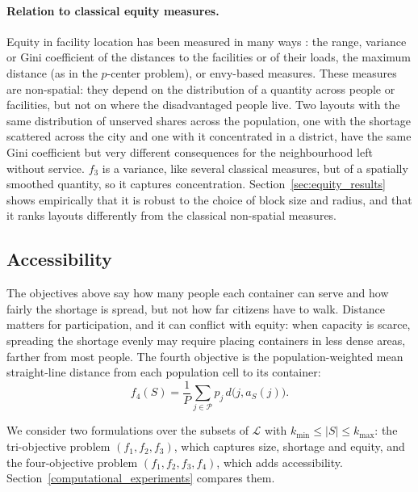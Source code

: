 \paragraph{Relation to classical equity measures.}
Equity in facility location has been measured in many ways \cite{marsh1994equity,barbati2016equality}: the range, variance or Gini coefficient of the distances to the facilities or of their loads, the maximum distance (as in the $p$-center problem), or envy-based measures. These measures are non-spatial: they depend on the distribution of a quantity across people or facilities, but not on where the disadvantaged people live. Two layouts with the same distribution of unserved shares across the population, one with the shortage scattered across the city and one with it concentrated in a district, have the same Gini coefficient but very different consequences for the neighbourhood left without service. $f_3$ is a variance, like several classical measures, but of a spatially smoothed quantity, so it captures concentration. Section~\ref{sec:equity_results} shows empirically that it is robust to the choice of block size and radius, and that it ranks layouts differently from the classical non-spatial measures.

\subsection{Accessibility}
\label{sec:accessibility}
The objectives above say how many people each container can serve and how fairly the shortage is spread, but not how far citizens have to walk. Distance matters for participation, and it can conflict with equity: when capacity is scarce, spreading the shortage evenly may require placing containers in less dense areas, farther from most people. The fourth objective is the population-weighted mean straight-line distance from each population cell to its container:
\begin{equation}
    f_4(S) = \frac{1}{P} \sum_{j \in \mathcal{P}} p_j \, d\big(j, a_S(j)\big).
\end{equation}

We consider two formulations over the subsets of $\mathcal{L}$ with $k_{\min} \leq |S| \leq k_{\max}$: the tri-objective problem $(f_1, f_2, f_3)$, which captures size, shortage and equity, and the four-objective problem $(f_1, f_2, f_3, f_4)$, which adds accessibility. Section~\ref{computational_experiments} compares them.
